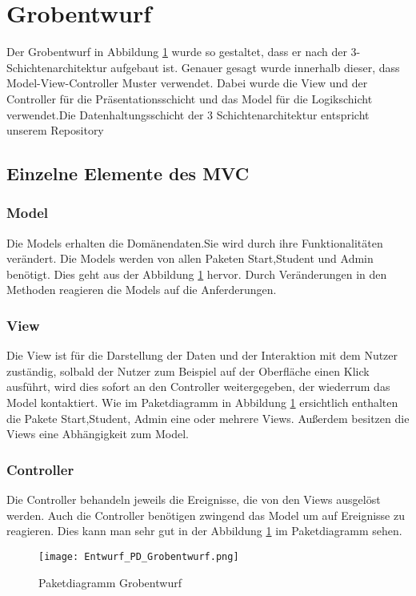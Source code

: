 \documentclass[a4paper,10pt]{article}
\begin{document}
\section{Grobentwurf}
Der Grobentwurf in Abbildung \ref{fig:Paketdiagramm_Grobentwurf} wurde so gestaltet, dass er nach der 3-Schichtenarchitektur aufgebaut ist. Genauer gesagt wurde innerhalb dieser, dass Model-View-Controller Muster verwendet. 
Dabei wurde die View und der Controller für die Präsentationsschicht und das Model für die Logikschicht verwendet.Die Datenhaltungsschicht der 3 Schichtenarchitektur entspricht unserem Repository

\subsection{Einzelne Elemente des MVC}
  \subsubsection{Model} 
    Die Models erhalten die Domänendaten.Sie wird durch ihre Funktionalitäten verändert. Die Models werden von allen Paketen Start,Student und Admin ben\"otigt. Dies geht aus der Abbildung \ref{fig:Paketdiagramm_Grobentwurf} hervor.
    Durch Ver\"anderungen in den Methoden reagieren die Models auf die Anferderungen.
   \subsubsection{View}
   Die View ist für die Darstellung der Daten und der Interaktion mit dem Nutzer zuständig, solbald der Nutzer zum Beispiel auf der Oberfläche einen Klick ausführt, wird dies sofort an den Controller weitergegeben, der wiederrum das Model kontaktiert.
   Wie im Paketdiagramm in  Abbildung \ref{fig:Paketdiagramm_Grobentwurf} ersichtlich enthalten die Pakete Start,Student, Admin eine oder mehrere Views.
   Au\ss{}erdem besitzen die Views eine Abh\"angigkeit zum Model.
   \subsubsection{Controller}
   Die Controller behandeln jeweils die Ereignisse, die von den Views ausgelöst werden. Auch die Controller ben\"otigen zwingend das Model um auf Ereignisse zu reagieren. Dies kann man sehr gut in der Abbildung \ref{fig:Paketdiagramm_Grobentwurf} im Paketdiagramm sehen.
   
   \begin{figure}
    \texttt{[image: Entwurf\_PD\_Grobentwurf.png]}
    \label{fig:Paketdiagramm_Grobentwurf}
    \caption{Paketdiagramm Grobentwurf}
   \end{figure} 
\end{document}
